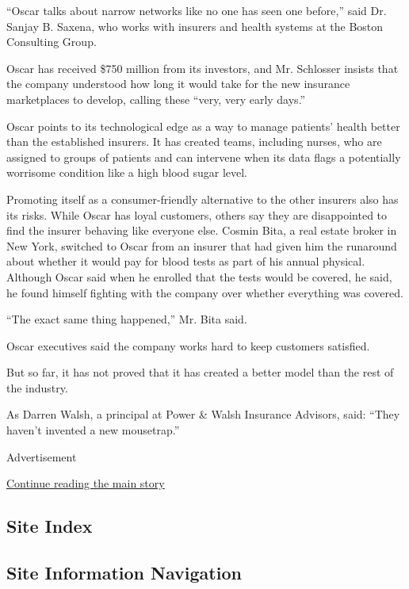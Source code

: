 ``Oscar talks about narrow networks like no one has seen one before,''
said Dr. Sanjay B. Saxena, who works with insurers and health systems at
the Boston Consulting Group.

Oscar has received \$750 million from its investors, and Mr. Schlosser
insists that the company understood how long it would take for the new
insurance marketplaces to develop, calling these ``very, very early
days.''

Oscar points to its technological edge as a way to manage patients'
health better than the established insurers. It has created teams,
including nurses, who are assigned to groups of patients and can
intervene when its data flags a potentially worrisome condition like a
high blood sugar level.

Promoting itself as a consumer-friendly alternative to the other
insurers also has its risks. While Oscar has loyal customers, others say
they are disappointed to find the insurer behaving like everyone else.
Cosmin Bita, a real estate broker in New York, switched to Oscar from an
insurer that had given him the runaround about whether it would pay for
blood tests as part of his annual physical. Although Oscar said when he
enrolled that the tests would be covered, he said, he found himself
fighting with the company over whether everything was covered.

``The exact same thing happened,'' Mr. Bita said.

Oscar executives said the company works hard to keep customers
satisfied.

But so far, it has not proved that it has created a better model than
the rest of the industry.

As Darren Walsh, a principal at Power \& Walsh Insurance Advisors, said:
``They haven't invented a new mousetrap.''

Advertisement

\protect\hyperlink{after-bottom}{Continue reading the main story}

\hypertarget{site-index}{%
\subsection{Site Index}\label{site-index}}

\hypertarget{site-information-navigation}{%
\subsection{Site Information
Navigation}\label{site-information-navigation}}

